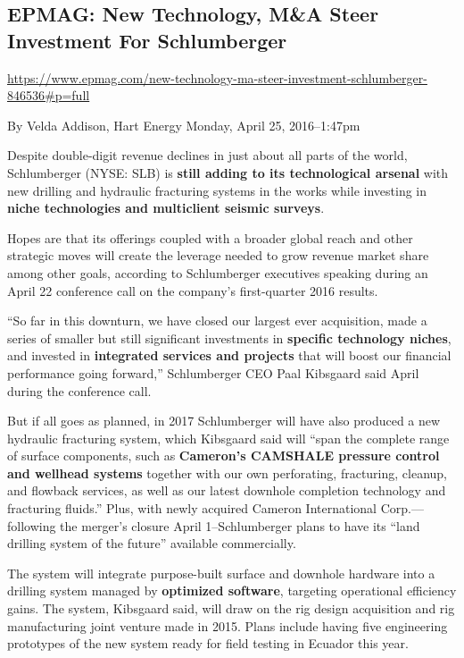 \documentclass[12pt,a4paper]{article}
\begin{document}
\subsection{EPMAG: New Technology, M\&A Steer Investment For Schlumberger}


\url{https://www.epmag.com/new-technology-ma-steer-investment-schlumberger-846536#p=full}

By Velda Addison, Hart Energy Monday, April 25, 2016--1:47pm

Despite double-digit revenue declines in just about all parts of the world,
Schlumberger (NYSE: SLB) is \textbf{still adding to its technological
  arsenal} with new drilling and hydraulic fracturing systems in the works
while investing in \textbf{niche technologies and multiclient seismic
  surveys}.

Hopes are that its offerings coupled with a broader global reach and other
strategic moves will create the leverage needed to grow revenue market share
among other goals, according to Schlumberger executives speaking during an
April 22 conference call on the company's first-quarter 2016 results.

``So far in this downturn, we have closed our largest ever acquisition, made
a series of smaller but still significant investments in \textbf{specific
  technology niches}, and invested in \textbf{integrated services and
  projects} that will boost our financial performance going forward,''
Schlumberger CEO Paal Kibsgaard said April during the conference call.

But if all goes as planned, in 2017 Schlumberger will have also produced a
new hydraulic fracturing system, which Kibsgaard said will ``span the
complete range of surface components, such as \textbf{Cameron's CAMSHALE
  pressure control and wellhead systems} together with our own perforating,
fracturing, cleanup, and flowback services, as well as our latest downhole
completion technology and fracturing fluids.'' Plus, with newly acquired
Cameron International Corp.---following the merger's closure April
1--Schlumberger plans to have its ``land drilling system of the future''
available commercially.

The system will integrate purpose-built surface and downhole hardware into a
drilling system managed by \textbf{optimized software}, targeting
operational efficiency gains. The system, Kibsgaard said, will draw on the
rig design acquisition and rig manufacturing joint venture made in 2015.
Plans include having five engineering prototypes of the new system ready for
field testing in Ecuador this year.
\end{document}
